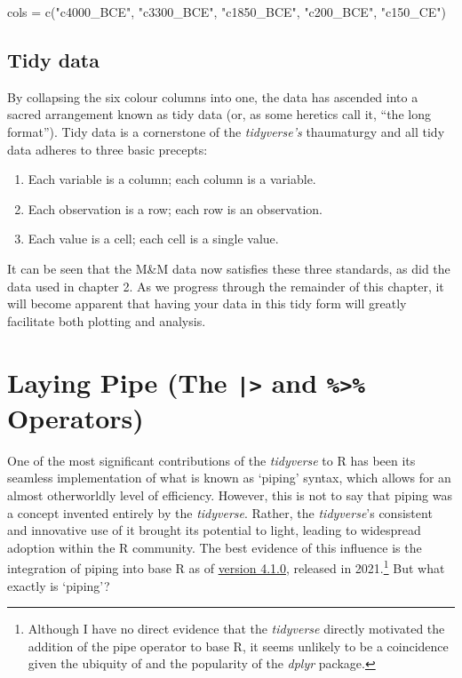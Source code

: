 \begin{inR}
cols = c("c4000_BCE", "c3300_BCE", "c1850_BCE", "c200_BCE", "c150_CE")
\end{inR}
\vspace{1em}

\subsection{Tidy data}

By collapsing the six colour columns into one, the data has ascended into a sacred arrangement known as \gls{tidy data} (or, as some heretics call it, ``the long format'').  Tidy data is a cornerstone of the \textit{tidyverse's} thaumaturgy and all tidy data adheres to three basic precepts:

\begin{minipage}{\textwidth}

\begin{enumerate}[label=\Roman*.]
\IMFellEnglish
    \item Each variable is a column; each column is a variable.
    \item Each observation is a row; each row is an observation.
    \item Each value is a cell; each cell is a single value.
\end{enumerate}
\end{minipage}

\noindent
It can be seen that the M\&M data now satisfies these three standards, as did the  data used in chapter 2. As we progress through the remainder of this chapter, it will become apparent that having your data in this tidy form will greatly facilitate both plotting and analysis. 


\section{Laying Pipe (The \texttt{|>} and \texttt{\%>\%} Operators)}

One of the most significant contributions of the \textit{tidyverse} to R has been its seamless implementation of what is known as `piping' syntax, which allows for an almost otherworldly level of efficiency. However, this is not to say that piping was a concept invented entirely by the \textit{tidyverse}. Rather, the \textit{tidyverse}'s consistent and innovative use of it brought its potential to light, leading to widespread adoption within the R community. The best evidence of this influence is the integration of piping into base R as of \href{https://stat.ethz.ch/pipermail/r-announce/2021/000670.html}{version 4.1.0}, released in 2021.\footnote{Although I have no direct evidence that the \textit{tidyverse} directly motivated the addition of the pipe operator to base R, it seems unlikely to be a coincidence given the ubiquity of \R{\%>\%} and the popularity of the \textit{dplyr} package.} But what exactly is `piping'?

